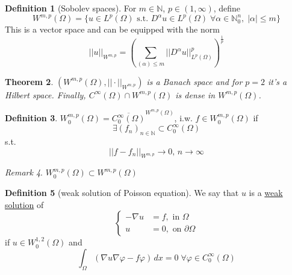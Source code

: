 \documentclass[a4paper, 12pt]{article}
\theoremstyle{plain}
\newtheorem{theorem}{Theorem}[section] %
\theoremstyle{definition}
\newtheorem{definition}[theorem]{Definition} %
\theoremstyle{lemma}
\theoremstyle{remark}
\newtheorem{remark}[theorem]{Remark}
\theoremstyle{corollary}
\theoremstyle{example}
\begin{document}
	\begin{definition}[Sobolev spaces]
		For $m \in \mathbb{N}$, $p \in (1,\infty)$, define \[W^{m,p}(\Omega) = \{u \in L^p(\Omega) \text{ s.t. } D^\alpha u \in L^p(\Omega) \; \forall \alpha \in \mathbb{N}_0^n, \; \left|\alpha\right| \leq m\}\] This is a vector space and can be equipped with the norm \[||u||_{W^{m,p}} = \left(\sum_{\left(\alpha\right) \leq m} ||D^\alpha u||^p_{L^p(\Omega)}\right)^{\frac{1}{p}}\]
	\end{definition}
	\begin{theorem}
		$(W^{m,p}(\Omega), ||\cdot||_{W^{m,p}})$ is a Banach space and for $p=2$ it's a Hilbert space. Finally, $C^\infty(\Omega) \cap W^{m,p}(\Omega)$ is dense in $W^{m,p}(\Omega)$.
	\end{theorem}
	\begin{definition}
		$W_0^{m,p}(\Omega) = \overline{C_0^\infty(\Omega)}^{W^{m,p}(\Omega)}$, i.w. $f \in W_0^{m,p}(\Omega)$ if \[\exists (f_n)_{n \in \mathbb{N}} \subset C_0^\infty (\Omega)\] s.t. \[||f-f_n||_{W^{m,p}} \to 0, \, n \to \infty\]
	\end{definition}
	\begin{remark}
		$W_0^{m,p}(\Omega) \subset W^{m,p}(\Omega)$
	\end{remark}
	\begin{definition}[weak solution of Poisson equation]
		We say that $u$ is a \underline{weak solution} of \[\begin{cases}
			-\nabla u &= f, \text{ in } \Omega\\
			u &= 0, \text{ on } \partial \Omega
		\end{cases}\] if $u \in W_0^{1,2}(\Omega)$ and \[\int_\Omega (\nabla u \nabla \varphi - f\varphi) \, dx = 0 \; \forall \varphi \in C_0^\infty(\Omega)\]
	\end{definition}
\end{document}
